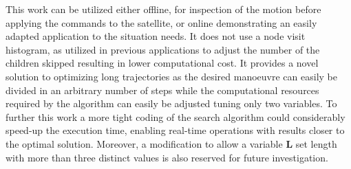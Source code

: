 \documentclass[journal]{new-aiaa}
\begin{document}
This work can be utilized either offline, for inspection of the motion before applying the commands to the satellite, or online demonstrating an easily adapted application to the situation needs. It does not use a node visit histogram, as utilized in previous applications to adjust the number of the children skipped resulting in lower computational cost. It provides a novel solution to optimizing long trajectories as the desired manoeuvre can easily be divided in an arbitrary number of steps while the computational resources required by the algorithm can easily be adjusted tuning only two variables.
To further this work a more tight coding of the search algorithm could considerably speed-up the execution time, enabling real-time operations with results closer to the optimal solution. Moreover, a modification to allow a variable $\textbf{L}$ set length with more than three distinct values is also reserved for future investigation.






\end{document}
